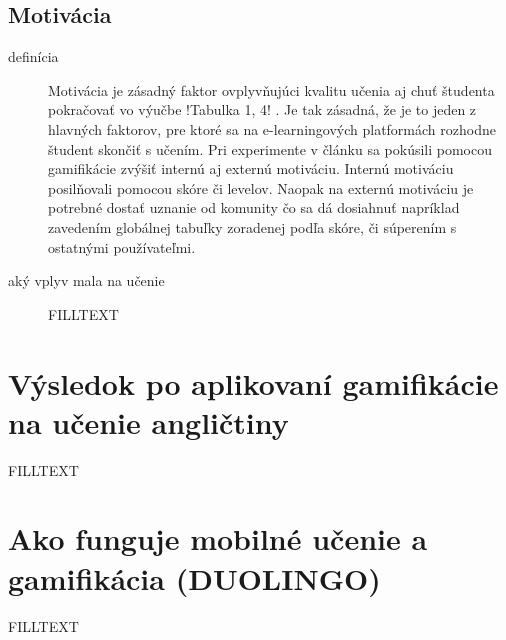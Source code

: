 \documentclass[10pt,slovak,a4paper]{article}
\begin{document}
\subsection{Motivácia} \label{motivation}
\begin{description}
\item [definícia] Motivácia je zásadný faktor ovplyvňujúci kvalitu učenia aj chuť študenta pokračovať vo výučbe !Tabulka 1, 4! . Je tak zásadná, že je to jeden z hlavných faktorov, pre ktoré sa na e-learningových platformách rozhodne študent skončiť s učením. Pri experimente v článku \cite{arce_valdivia_2020} sa pokúsili pomocou gamifikácie zvýšiť internú aj externú motiváciu. Internú motiváciu posilňovali pomocou skóre či levelov. Naopak na externú motiváciu je potrebné dostať uznanie od komunity čo sa dá dosiahnuť napríklad zavedením globálnej tabuľky zoradenej podľa skóre, či súperením s ostatnými používateľmi.

\item [aký vplyv mala na učenie] FILLTEXT
\end{description}


\section{Výsledok po aplikovaní gamifikácie na učenie angličtiny} \label{languagegemificationresult}

FILLTEXT


\section{Ako funguje mobilné učenie a gamifikácia (DUOLINGO)} \label{duolingo} %

FILLTEXT

\end{document}
